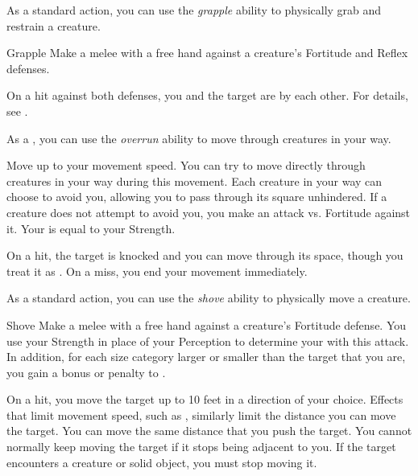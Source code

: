          As a standard action, you can use the \textit{grapple} ability to physically grab and restrain a creature.

        \begin{freeability}{Grapple}\label{Grapple}
            Make a melee  with a free hand against a creature's Fortitude and Reflex defenses.

            On a hit against both defenses, you and the target are \grappled by each other.
            For details, see .
        \end{freeability}

         As a , you can use the \textit{overrun} ability to move through creatures in your way.

        \begin{freeability}{}
            Move up to your movement speed.
            You can try to move directly through creatures in your way during this movement.
            Each creature in your way can choose to avoid you, allowing you to pass through its square unhindered.
            If a creature does not attempt to avoid you, you make an attack vs. Fortitude against it.
            Your  is equal to your Strength.

            On a hit, the target is knocked  and you can move through its space, though you treat it as .
            On a miss, you end your movement immediately.
        \end{freeability}

         As a standard action, you can use the \textit{shove} ability to physically move a creature.

        \begin{freeability}{Shove}\label{Shove}
            Make a melee  with a free hand against a creature's Fortitude defense.
            You use your Strength in place of your Perception to determine your  with this attack.
            In addition, for each size category larger or smaller than the target that you are, you gain a  bonus or penalty to .

            On a hit, you move the target up to 10 feet in a direction of your choice.
            Effects that limit movement speed, such as , similarly limit the distance you can move the target.
            You can move the same distance that you push the target.
            You cannot normally keep moving the target if it stops being adjacent to you.
            If the target encounters a creature or solid object, you must stop moving it.
        \end{freeability}


